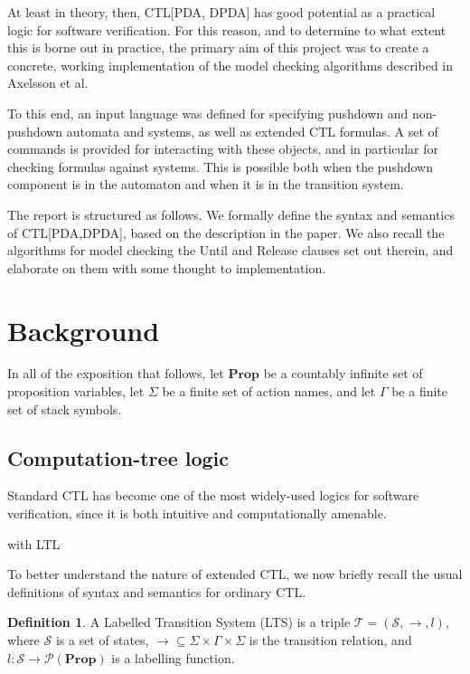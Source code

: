 \documentclass[11pt]{article}
\theoremstyle{definition}
\newtheorem{mydef}{Definition}
\begin{document}
At least in theory, then, CTL[PDA, DPDA] has good potential as a practical
logic for software verification. For this reason, and to determine to what
extent this is borne out in practice, the primary aim of this project was to
create a concrete, working implementation of the model checking algorithms
described in Axelsson et al.


To this end, an input language was defined for specifying pushdown and
non-pushdown automata and systems, as well as extended CTL formulas.  A set of
commands is provided for interacting with these objects, and in particular for
checking formulas against systems.  This is possible both when the pushdown
component is in the automaton and when it is in the transition system.



The report is structured as follows. We formally define the syntax and
semantics of CTL[PDA,DPDA], based on the description in the paper. We also
recall the algorithms for model checking the Until and Release clauses set out
therein, and elaborate on them with some thought to implementation.

\section{Background}

In all of the exposition that follows, let $\textbf{Prop}$ be a countably
infinite set of proposition variables, let $\Sigma$ be a finite set of action
names, and let $\Gamma$ be a finite set of stack symbols.

\subsection{Computation-tree logic}

Standard CTL has become %
one of the most widely-used logics for software verification, since it is both
intuitive and computationally amenable.

with LTL

To better understand the nature of extended CTL, we now briefly recall the
usual definitions of syntax and semantics for ordinary CTL.

\begin{mydef}
A Labelled Transition System (LTS) is a triple $\mathcal{T} = (\mathcal{S}, \rightarrow, l)$,
where $\mathcal{S}$ is a set of states, $\rightarrow \subseteq \Sigma \times
\Gamma \times \Sigma$ is the transition relation, and $l:\mathcal{S}
\rightarrow \mathcal{P}(\textbf{Prop})$ is a labelling function.
\end{mydef}
\end{document}
